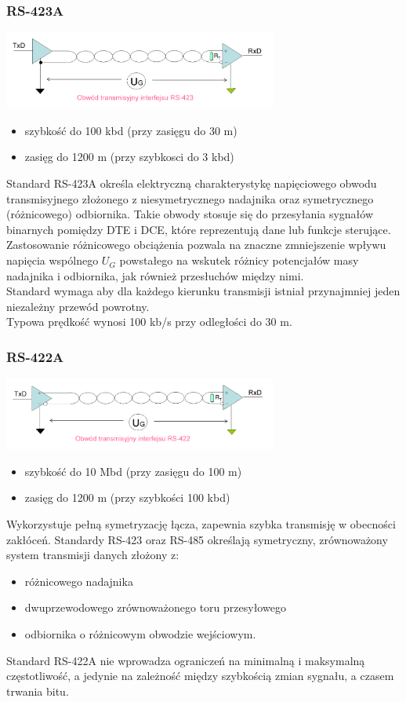 \documentclass[a4paper,twoside]{article}
\begin{document}
		\subsubsection{RS-423A}
		\includegraphics[width=9cm]{./wyklady/RS232_12_1.pdf}
		\begin{itemize}
			\item szybkość do 100 kbd (przy zasięgu do 30 m)
			\item zasięg do 1200 m (przy szybkosci do 3 kbd)
		\end{itemize}
		Standard RS-423A określa elektryczną charakterystykę napięciowego obwodu transmisyjnego złożonego z niesymetrycznego nadajnika oraz symetrycznego (różnicowego) odbiornika. Takie obwody stosuje się do przesyłania sygnałów binarnych pomiędzy DTE i DCE, które reprezentują dane lub funkcje sterujące.\\
		Zastosowanie różnicowego obciążenia pozwala na znaczne zmniejszenie wpływu napięcia wspólnego $U_{G}$ powstałego na wskutek różnicy potencjałów masy nadajnika i odbiornika, jak również przesłuchów między nimi.\\
		Standard wymaga aby dla każdego kierunku transmisji istniał przynajmniej jeden niezależny przewód powrotny.\\
		Typowa prędkość wynosi 100 kb/s przy odległości do 30 m.
		\subsubsection{RS-422A}
		\includegraphics[width=9cm]{./wyklady/RS232_12_2.pdf}
		\begin{itemize}
			\item szybkość do 10 Mbd (przy zasięgu do 100 m)
			\item zasięg do 1200 m (przy szybkości 100 kbd)
		\end{itemize}
		Wykorzystuje pełną symetryzację łącza, zapewnia szybka transmisję w obecności zakłóceń. Standardy RS-423 oraz RS-485 określają symetryczny, zrównoważony system transmisji danych złożony z:
		\begin{itemize}
			\item różnicowego nadajnika
			\item dwuprzewodowego zrównoważonego toru przesyłowego
			\item odbiornika o różnicowym obwodzie wejściowym.
		\end{itemize}
		Standard RS-422A nie wprowadza ograniczeń na minimalną i maksymalną częstotliwość, a jedynie na zależność między szybkością zmian sygnału, a czasem trwania bitu.
\end{document}
